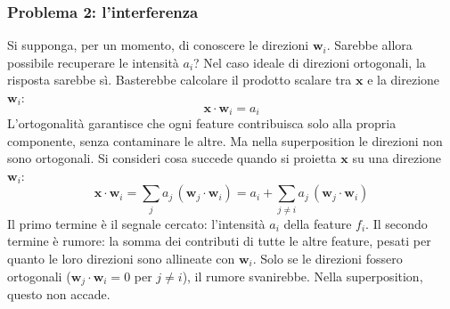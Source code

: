 \subsubsection{Problema 2: l'interferenza}
Si supponga, per un momento, di conoscere le direzioni $\mathbf{w}_i$. Sarebbe allora possibile recuperare le intensità $a_i$?
Nel caso ideale di direzioni ortogonali, la risposta sarebbe sì. Basterebbe calcolare il prodotto scalare tra $\mathbf{x}$ e la direzione $\mathbf{w}_i$:
\begin{equation}
    \mathbf{x} \cdot \mathbf{w}_i = a_i
\end{equation}
L'ortogonalità garantisce che ogni feature contribuisca solo alla propria componente, senza contaminare le altre.
Ma nella superposition le direzioni non sono ortogonali. Si consideri cosa succede quando si proietta $\mathbf{x}$ su una direzione $\mathbf{w}_i$:
\begin{equation}
    \mathbf{x} \cdot \mathbf{w}_i = \sum_j a_j \, (\mathbf{w}_j \cdot \mathbf{w}_i) = a_i + \sum_{j \neq i} a_j \, (\mathbf{w}_j \cdot \mathbf{w}_i)
    \label{eq:interference}
\end{equation}
Il primo termine è il segnale cercato: l'intensità $a_i$ della feature $f_i$. Il secondo termine è rumore: la somma dei contributi di tutte le altre feature, pesati per quanto le loro direzioni sono allineate con $\mathbf{w}_i$.
Solo se le direzioni fossero ortogonali ($\mathbf{w}_j \cdot \mathbf{w}_i = 0$ per $j \neq i$), il rumore svanirebbe. Nella superposition, questo non accade.
